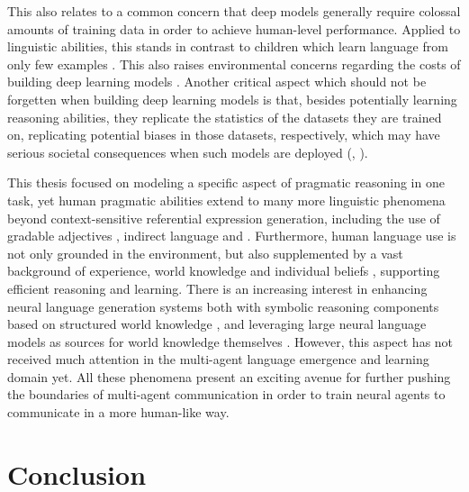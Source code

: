 This also relates to a common concern that deep models generally require colossal amounts of training data in order to achieve human-level performance. Applied to linguistic abilities, this stands in contrast to children which learn language from only few examples \parencite[e.~g.,][]{xu2007word}. This also raises environmental concerns regarding the costs of building deep learning models \parencite{bender2021dangers}.  
Another critical aspect which should not be forgetten when building deep learning models is that, besides potentially learning reasoning abilities, they replicate the statistics of the datasets they are trained on, replicating potential biases in those datasets, respectively, which may have serious societal consequences when such models are deployed (\cite{bender2021dangers}, \cite{buolamwini2018gender}). 

This thesis focused on modeling a specific aspect of pragmatic reasoning in one task, yet human pragmatic abilities extend to many more linguistic phenomena beyond context-sensitive referential expression generation, including the use of gradable adjectives \parencite{qing2014gradable}, indirect language \parencite{yoon2016talking} and .
Furthermore, human language use is not only grounded in the environment, but also supplemented by a vast background of experience, world knowledge and individual beliefs \parencite{lake2017building, franke2016does}, supporting efficient reasoning and learning. There is an increasing interest in enhancing neural language generation systems both with symbolic reasoning components based on structured world knowledge \parencite[e.~g.,][]{nye2021improving}, and leveraging large neural language models as sources for world knowledge themselves \parencite{petroni2019language}. However, this aspect has not received much attention in the multi-agent language emergence and learning domain yet. 
All these phenomena present an exciting avenue for further pushing the boundaries of multi-agent communication in order to train neural agents to communicate in a more human-like way. 

\section{Conclusion}

